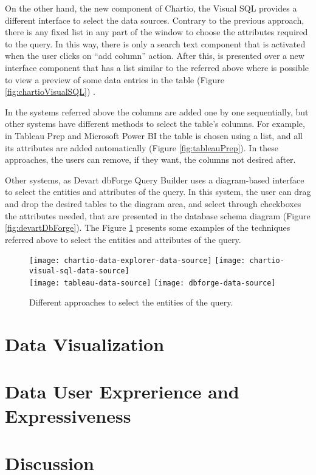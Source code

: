 On the other hand, the new component of Chartio, the Visual SQL provides a different interface to select the data sources. Contrary to the previous approach, there is any fixed list in any part of the window to choose the attributes required to the query. In this way, there is only a search text component that is activated when the user clicks on “add column” action. After this, is presented over a new interface component that has a list similar to the referred above where is possible to view a preview of some data entries in the table (Figure \ref{fig:chartioVisualSQL}) \cite{chartioVisualSQL}. 

In the systems referred above the columns are added one by one sequentially, but other systems have different methods to select the table’s columns. For example, in Tableau Prep \cite{tableauPrep} and Microsoft Power BI \cite{powerBI} the table is chosen using a list, and all its attributes are added automatically (Figure \ref{fig:tableauPrep}). In these approaches, the users can remove, if they want, the columns not desired after. \cite{tableauPrepHelpWhatsNew} \cite{powerBIShapeAndCombineData}

Other systems, as Devart dbForge Query Builder \cite{dbForgeQueryBuilder} uses a diagram-based interface to select the entities and attributes of the query. In this system, the user can drag and drop the desired tables to the diagram area, and select through checkboxes the attributes needed, that are presented in the database schema diagram (Figure \ref{fig:devartDbForge}). The Figure \ref{fig:approaches_select_data_sources} presents some examples of the techniques referred above to select the entities and attributes of the query.


\begin{figure}[htbp]
    \centering
      {\texttt{[image: chartio-data-explorer-data-source]}}%
      {\texttt{[image: chartio-visual-sql-data-source]}}%
      \\
    {\texttt{[image: tableau-data-source]}}%
    {\texttt{[image: dbforge-data-source]}}%
  \caption{Different approaches to select the entities of the query.}
    \label{fig:approaches_select_data_sources}
  \end{figure}

\section{Data Visualization}
\label{sec:data_visualization}

\section{Data User Exprerience and Expressiveness}
\label{sec:data_user_experience_and_expressiveness}

\section{Discussion}
\label{sec:discussion}